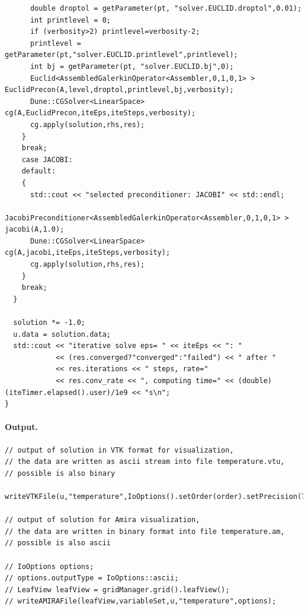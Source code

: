 \documentclass[11pt]{article}
\begin{document}
\begin{lstlisting}
      double droptol = getParameter(pt, "solver.EUCLID.droptol",0.01);
      int printlevel = 0;
      if (verbosity>2) printlevel=verbosity-2;
      printlevel = getParameter(pt,"solver.EUCLID.printlevel",printlevel);
      int bj = getParameter(pt, "solver.EUCLID.bj",0);
      Euclid<AssembledGalerkinOperator<Assembler,0,1,0,1> > EuclidPrecon(A,level,droptol,printlevel,bj,verbosity);
      Dune::CGSolver<LinearSpace> cg(A,EuclidPrecon,iteEps,iteSteps,verbosity);
      cg.apply(solution,rhs,res);
    }
    break;
    case JACOBI:
    default:
    {
      std::cout << "selected preconditioner: JACOBI" << std::endl;
      JacobiPreconditioner<AssembledGalerkinOperator<Assembler,0,1,0,1> > jacobi(A,1.0);
      Dune::CGSolver<LinearSpace> cg(A,jacobi,iteEps,iteSteps,verbosity);
      cg.apply(solution,rhs,res);
    }
    break;
  }
        
  solution *= -1.0;
  u.data = solution.data;
  std::cout << "iterative solve eps= " << iteEps << ": " 
            << (res.converged?"converged":"failed") << " after "
            << res.iterations << " steps, rate="
            << res.conv_rate << ", computing time=" << (double)(iteTimer.elapsed().user)/1e9 << "s\n";
}
\end{lstlisting}


\paragraph{Output.} \qquad

\begin{lstlisting}
// output of solution in VTK format for visualization,
// the data are written as ascii stream into file temperature.vtu,
// possible is also binary

writeVTKFile(u,"temperature",IoOptions().setOrder(order).setPrecision(7));

// output of solution for Amira visualization,
// the data are written in binary format into file temperature.am,
// possible is also ascii

// IoOptions options;
// options.outputType = IoOptions::ascii;
// LeafView leafView = gridManager.grid().leafView();
// writeAMIRAFile(leafView,variableSet,u,"temperature",options);
\end{lstlisting}
\end{document}
